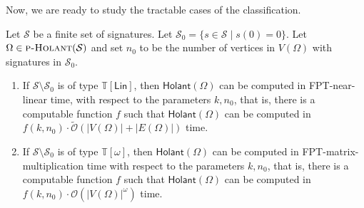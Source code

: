 \documentclass[authorcolumns,numberwithinsect]{no-lipics-v2022}
\newcommand{\holantprob}{\text{\sc{p-Holant}}}
\newcommand{\holant}{\mathsf{Holant}}
\begin{document}
Now, we are ready to study the tractable cases of the classification.

\begin{lemma}\label{lem:reductionRestrictedHolant}
Let $\mathcal{S}$ be a finite set of signatures. Let $\mathcal{S}_0 = \{s \in \mathcal{S} \mid s(0) = 0\}$. Let $\Omega \in \holantprob(\mathcal{S})$ and set $n_0$ to be the number of vertices in $V(\Omega)$ with signatures in $\mathcal{S}_0$.
\begin{enumerate}
\item If $\mathcal{S}\setminus\mathcal{S}_0$ is of type $\mathbb{T}[\mathsf{Lin}]$, then $\holant(\Omega)$ can be computed in FPT-near-linear time, with respect to the parameters $k, n_0$, that is, there is a computable function $f$ such that $\holant(\Omega)$ can be computed in $f(k,n_0)\cdot\tilde{\mathcal{O}}(|V(\Omega)| + |E(\Omega)|)$ time.
\item If $\mathcal{S}\setminus\mathcal{S}_0$ is of type $\mathbb{T}[\omega]$, then $\holant(\Omega)$ can be computed in FPT-matrix-multiplication time with respect to the parameters $k, n_0$, that is, there is a computable function $f$ such that $\holant(\Omega)$ can be computed in $f(k, n_0)\cdot\mathcal{O}(|V(\Omega)|^{\omega})$ time.
\end{enumerate}
\end{lemma}
\end{document}
